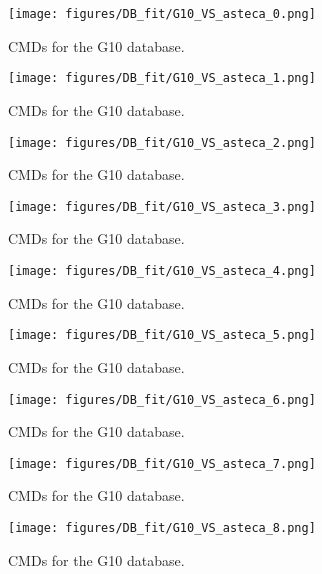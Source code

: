 \documentclass[draft]{aa}
\begin{document}
\begin{appendix}
\begin{figure*}
\texttt{[image: figures/DB\_fit/G10\_VS\_asteca\_0.png]}
\caption{CMDs for the G10 database.}
\label{fig:DBs_G10_0}
\end{figure*}
\clearpage

\begin{figure*}
\texttt{[image: figures/DB\_fit/G10\_VS\_asteca\_1.png]}
\caption{CMDs for the G10 database.}
\label{fig:DBs_G10_1}
\end{figure*}
\clearpage

\begin{figure*}
\texttt{[image: figures/DB\_fit/G10\_VS\_asteca\_2.png]}
\caption{CMDs for the G10 database.}
\label{fig:DBs_G10_2}
\end{figure*}
\clearpage

\begin{figure*}
\texttt{[image: figures/DB\_fit/G10\_VS\_asteca\_3.png]}
\caption{CMDs for the G10 database.}
\label{fig:DBs_G10_3}
\end{figure*}
\clearpage

\begin{figure*}
\texttt{[image: figures/DB\_fit/G10\_VS\_asteca\_4.png]}
\caption{CMDs for the G10 database.}
\label{fig:DBs_G10_4}
\end{figure*}
\clearpage

\begin{figure*}
\texttt{[image: figures/DB\_fit/G10\_VS\_asteca\_5.png]}
\caption{CMDs for the G10 database.}
\label{fig:DBs_G10_5}
\end{figure*}
\clearpage

\begin{figure*}
\texttt{[image: figures/DB\_fit/G10\_VS\_asteca\_6.png]}
\caption{CMDs for the G10 database.}
\label{fig:DBs_G10_6}
\end{figure*}
\clearpage

\begin{figure*}
\texttt{[image: figures/DB\_fit/G10\_VS\_asteca\_7.png]}
\caption{CMDs for the G10 database.}
\label{fig:DBs_G10_7}
\end{figure*}
\clearpage

\begin{figure}
\centering
\texttt{[image: figures/DB\_fit/G10\_VS\_asteca\_8.png]}
\caption{CMDs for the G10 database.}
\label{fig:DBs_G10_8}
\end{figure}





\end{appendix}
\end{document}
